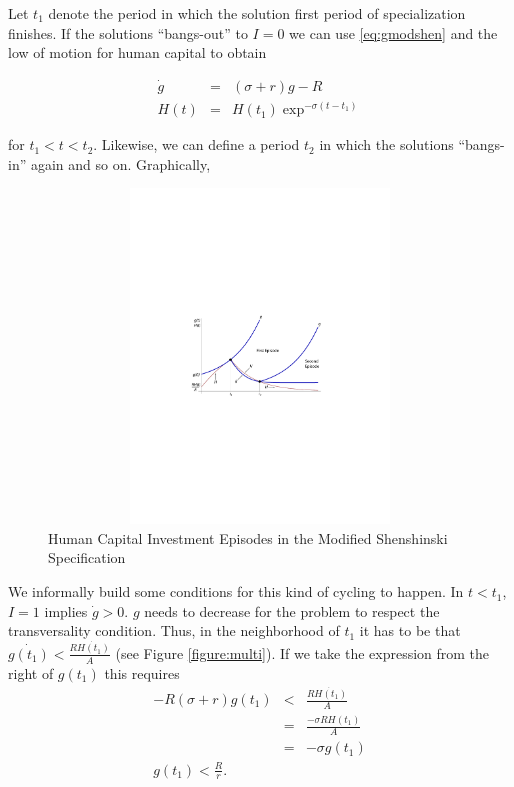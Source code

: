 \indent Let $t_{1}$ denote the period in which the solution first period of specialization finishes. If the solutions ``bangs-out'' to $I=0$ we can use \eqref{eq:gmodshen} and the low of motion for human capital to obtain

\begin{eqnarray}
\dot{g} &=& (\sigma + r)g - R \nonumber \\
H(t) &=& H(t_{1}) \exp^{-\sigma(t - t_{1})} 
\end{eqnarray}

\noindent for $t_{1} < t < t_{2}$. Likewise, we can define a period $t_{2}$ in which the solutions ``bangs-in'' again and so on. Graphically,

\begin{center}
\begin{figure}[H]
\caption{Human Capital Investment Episodes in the Modified Shenshinski Specification} \label{figure:multi}
\centering
\includegraphics[width=4.5in, height=3.5in]{Figures/fig-shesh-one-traj.pdf}
\end{figure}
\end{center}

\indent We informally build some conditions for this kind of cycling to happen. In $t < t_{1}$, $I = 1$ implies $\dot{g} > 0$. $g$ needs to decrease for the problem to respect the transversality condition. Thus, in the neighborhood of $t_{1}$ it has to be that $\dot{g(t_{1})} < \frac{R \dot{H(t_{1})}}{A}$ (see Figure \eqref{figure:multi}). If we take the expression from the right of $g(t_{1})$ this requires
\begin{eqnarray}
- R (\sigma + r) g(t_{1}) &<& \frac{R \dot{H(t_{1})}}{A} \nonumber \\
&=& \frac{- \sigma R H(t_{1})}{A} \nonumber \\
&=& -\sigma g(t_{1}) \nonumber \\
g(t_{1}) < \frac{R}{r}.  
\end{eqnarray}

